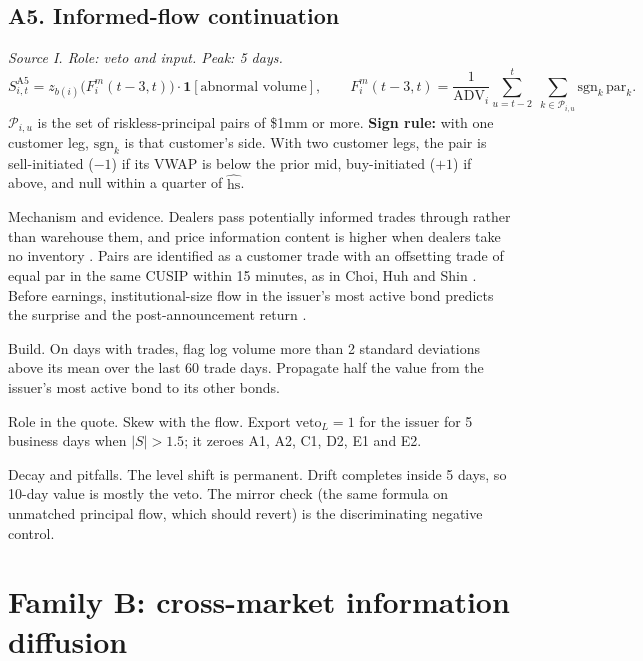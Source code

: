 \documentclass[11pt,letterpaper]{article}
\newcommand{\ind}[1]{\mathbf{1}\!\left[#1\right]}
\newcommand{\hs}{\mathrm{hs}}             %
\newcommand{\ADV}{\mathrm{ADV}}
\begin{document}
\subsection{A5. Informed-flow continuation}
\emph{Source I. Role: veto and input. Peak: 5 days.}
\begin{equation}
S^{\mathrm{A5}}_{i,t}=z_{b(i)}\!\bigl(F^{m}_i(t-3,t)\bigr)\cdot\ind{\text{abnormal volume}},\qquad
F^{m}_i(t-3,t)=\frac{1}{\ADV_i}\sum_{u=t-2}^{t}\;\sum_{k\in\mathcal{P}_{i,u}}\mathrm{sgn}_k\,\mathrm{par}_k .
\end{equation}
$\mathcal{P}_{i,u}$ is the set of riskless-principal pairs of \$1mm or more. \textbf{Sign rule:} with one customer leg, $\mathrm{sgn}_k$ is that customer's side. With two customer legs, the pair is sell-initiated ($-1$) if its VWAP is below the prior mid, buy-initiated ($+1$) if above, and null within a quarter of $\widehat{\hs}$.
\begin{spec}
\item[Mechanism and evidence.] Dealers pass potentially informed trades through rather than warehouse them, and price information content is higher when dealers take no inventory \cite{iva2024}. Pairs are identified as a customer trade with an offsetting trade of equal par in the same CUSIP within 15 minutes, as in Choi, Huh and Shin \cite{chs2024}. Before earnings, institutional-size flow in the issuer's most active bond predicts the surprise and the post-announcement return \cite{wz2016}.
\item[Build.] On days with trades, flag log volume more than 2 standard deviations above its mean over the last 60 trade days. Propagate half the value from the issuer's most active bond to its other bonds.
\item[Role in the quote.] Skew with the flow. Export $\mathrm{veto}_L=1$ for the issuer for 5 business days when $|S|>1.5$; it zeroes A1, A2, C1, D2, E1 and E2.
\item[Decay and pitfalls.] The level shift is permanent. Drift completes inside 5 days, so 10-day value is mostly the veto. The mirror check (the same formula on unmatched principal flow, which should revert) is the discriminating negative control.
\end{spec}

\section{Family B: cross-market information diffusion}
\label{sec:famB}
\end{document}
